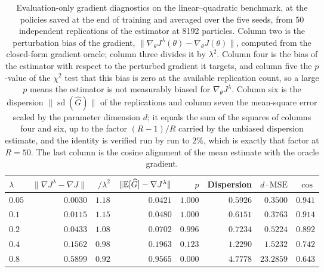 \begin{table}[H]
\centering
\small
\begin{tabular}{lrrrrrrr}
\toprule
$\lambda$ & $\lVert\nabla J^\lambda-\nabla J\rVert$ & $/\lambda^2$ & $\lVert\mathbb{E}[\widehat G]-\nabla J^\lambda\rVert$ & $p$ & Dispersion & $d\cdot\mathrm{MSE}$ & $\cos$ \\
\midrule
$0.05$ & $0.0030$ & $1.18$ & $0.0421$ & $1.000$ & $0.5926$ & $0.3500$ & $0.941$ \\
$0.1$ & $0.0115$ & $1.15$ & $0.0480$ & $1.000$ & $0.6151$ & $0.3763$ & $0.914$ \\
$0.2$ & $0.0433$ & $1.08$ & $0.0702$ & $0.996$ & $0.7234$ & $0.5224$ & $0.892$ \\
$0.4$ & $0.1562$ & $0.98$ & $0.1963$ & $0.123$ & $1.2290$ & $1.5232$ & $0.742$ \\
$0.8$ & $0.5899$ & $0.92$ & $0.9565$ & $0.000$ & $4.7778$ & $23.2859$ & $0.643$ \\
\bottomrule
\end{tabular}
\caption{Evaluation-only gradient diagnostics on the linear--quadratic benchmark, at the policies saved at the end of training and averaged over the five seeds, from 50 independent replications of the estimator at 8192 particles. Column two is the perturbation bias of the gradient, $\lVert\nabla_\theta J^\lambda(\theta)-\nabla_\theta J(\theta)\rVert$, computed from the closed-form gradient oracle; column three divides it by $\lambda^2$. Column four is the bias of the estimator with respect to the perturbed gradient it targets, and column five the $p$-value of the $\chi^2$ test that this bias is zero at the available replication count, so a large $p$ means the estimator is not measurably biased for $\nabla_\theta J^\lambda$. Column six is the dispersion $\lVert\operatorname{sd}(\widehat G)\rVert$ of the replications and column seven the mean-square error scaled by the parameter dimension $d$; it equals the sum of the squares of columns four and six, up to the factor $(R-1)/R$ carried by the unbiased dispersion estimate, and the identity is verified run by run to $2\%$, which is exactly that factor at $R=50$. The last column is the cosine alignment of the mean estimate with the oracle gradient.}
\label{tab:gradient-diagnostics-lq}
\end{table}
